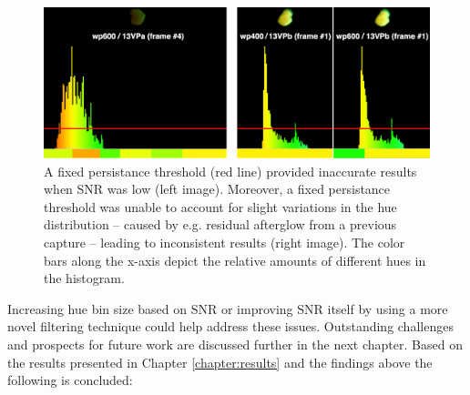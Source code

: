 \documentclass[thesis.tex]{subfiles}
\begin{document}
\begin{figure}[h!]
  \centering \includegraphics[page=1,width=\textwidth]{images/findings/persistance_pitfall}
  \vspace{-8mm}
  \caption{A fixed persistance threshold (red line) provided inaccurate results when SNR was low (left image). Moreover, a fixed persistance threshold was unable to account for slight variations in the hue distribution -- caused by e.g. residual afterglow from a previous capture -- leading to inconsistent results (right image). The color bars along the x-axis depict the relative amounts of different hues in the histogram.}
  \label{figure:fingerprint-method-pitfalls}
\end{figure}

Increasing hue bin size based on SNR or improving SNR itself by using a more novel filtering technique could help address these issues. Outstanding challenges and prospects for future work are discussed further in the next chapter. Based on the results presented in Chapter \ref{chapter:results} and the findings above the following is concluded:
\end{document}
